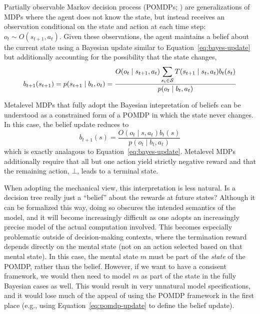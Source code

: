 Partially observable Markov decision process (POMDPs; \citealp{kaelbling1998planningbb}) are generalizations of MDPs where the agent does not know the state, but instead receives an observation conditional on the state and action at each time step: $o_t \sim O(s_{t+1}, a_t)$. Given these observations, the agent maintains a belief about the current state using a Bayesian update similar to Equation~\ref{eq:bayes-update} but additionally accounting for the possibility that the state changes,
%
\begin{equation}\label{eq:pomdp-update}
  b_{t+1}(s_{t+1}) = p(s_{t+1} \mid b_t, o_t) = \frac{
    O(o_t \mid s_{t+1}, a_t) \displaystyle\sum_{s_t \in \S} T(s_{t+1} \mid s_t, a_t) b_t(s_t)
  }{
    p(o_t \mid b_t, a_t)
  } 
\end{equation}
%

Metalevel MDPs that fully adopt the Bayesian intepretation of beliefs can be understood as a constrained form of a POMDP in which the state never changes. In this case, the belief update reduces to
\begin{equation}\label{eq:pomdp-update}
  b_{t+1}(s) =  
  \frac{O(o_t \mid s, a_t) b_t(s)}{p(o_t \mid b_t, a_t)}
\end{equation}
which is exactly analagous to Equation~\ref{eq:bayes-update}.
Metalevel MDPs additionally require that all but one action yield strictly negative reward and that the remaining action, $\bot$, leads to a terminal state.

When adopting the mechanical view, this interpretation is less natural. Is a decision tree really just a ``belief'' about the rewards at future states? Although it can be formalized this way, doing so obscures the intended semantics of the model, and it will become increasingly difficult as one adopts an increasingly precise model of the actual computation involved. This becomes especially problematic outside of decision-making contexts, where the termination reward depends directly on the mental state (not on an action selected based on that mental state). In this case, the mental state $m$ must be part of the \emph{state} of the POMDP, rather than the belief. However, if we want to have a consisent framework, we would then need to model $m$ as part of the state in the fully Bayesian cases as well. This would result in very unnatural model specifications, and it would lose much of the appeal of using the POMDP framework in the first place (e.g., using Equation~\ref{eq:pomdp-update} to define the belief update).

